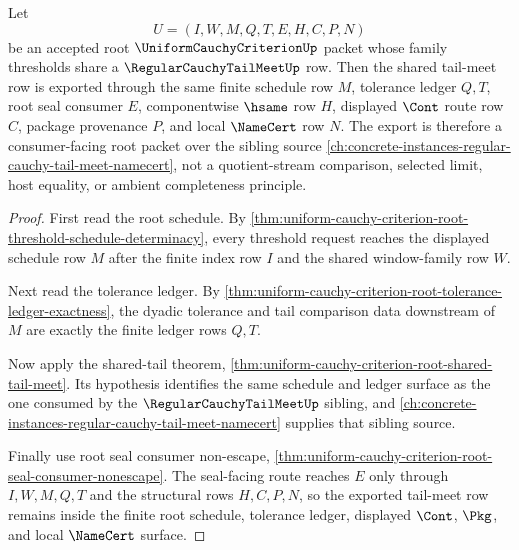 \begin{theorem}
\label{thm:uniform-cauchy-criterion-tail-meet-root-export}
Let
$$
U=(I,W,M,Q,T,E,H,C,P,N)
$$
be an accepted root $\UniformCauchyCriterionUp$ packet whose family thresholds share a $\RegularCauchyTailMeetUp$ row. Then the shared tail-meet row is exported through the same finite schedule row $M$, tolerance ledger $Q,T$, root seal consumer $E$, componentwise $\hsame$ row $H$, displayed $\Cont$ route row $C$, package provenance $P$, and local $\NameCert$ row $N$. The export is therefore a consumer-facing root packet over the sibling source \autoref{ch:concrete-instances-regular-cauchy-tail-meet-namecert}, not a quotient-stream comparison, selected limit, host equality, or ambient completeness principle.
\end{theorem}
\begin{proof}
First read the root schedule. By \autoref{thm:uniform-cauchy-criterion-root-threshold-schedule-determinacy}, every threshold request reaches the displayed schedule row $M$ after the finite index row $I$ and the shared window-family row $W$.

Next read the tolerance ledger. By \autoref{thm:uniform-cauchy-criterion-root-tolerance-ledger-exactness}, the dyadic tolerance and tail comparison data downstream of $M$ are exactly the finite ledger rows $Q,T$.

Now apply the shared-tail theorem, \autoref{thm:uniform-cauchy-criterion-root-shared-tail-meet}. Its hypothesis identifies the same schedule and ledger surface as the one consumed by the $\RegularCauchyTailMeetUp$ sibling, and \autoref{ch:concrete-instances-regular-cauchy-tail-meet-namecert} supplies that sibling source.

Finally use root seal consumer non-escape, \autoref{thm:uniform-cauchy-criterion-root-seal-consumer-nonescape}. The seal-facing route reaches $E$ only through $I,W,M,Q,T$ and the structural rows $H,C,P,N$, so the exported tail-meet row remains inside the finite root schedule, tolerance ledger, displayed $\Cont$, $\Pkg$, and local $\NameCert$ surface.
\end{proof}

